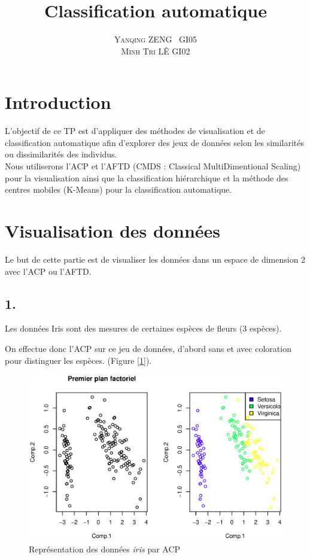 \documentclass{article}
\title{\vspace{-15mm}\fontsize{24pt}{10pt}\selectfont\textbf{Classification automatique}} %
\author{
\large
{\textsc{Yanqing ZENG~ GI05}}\\
{\textsc{Minh Tri LÊ GI02}}
}
\begin{document}
\maketitle %
\thispagestyle{fancy} %


\section*{Introduction}
L'objectif de ce TP est d'appliquer des méthodes de visualisation et de classification automatique afin d'explorer des jeux de données selon les similarités ou dissimilarités des individus.\\
Nous utiliserons l'ACP et l'AFTD (CMDS : Classical MultiDimentional Scaling) pour la visualisation ainsi que la classification hiérarchique et la méthode des centres mobiles (K-Means) pour la classification automatique.


\section{Visualisation des données}

Le but de cette partie est de visualiser les données dans un espace de dimension 2 avec l'ACP ou l'AFTD.

\subsection*{1.}

Les données Iris sont des mesures de certaines espèces de fleurs (3 espèces).

On effectue donc l'ACP sur ce jeu de données, d'abord sans et avec coloration pour distinguer les espèces. (Figure [\ref{iris_acp}]).
\begin{figure}[H]
\centering
\includegraphics[scale=0.5]{./img/iris_acp.eps}
\caption{Représentation des données \textit{iris} par ACP}
\label{iris_acp}
\end{figure}
\end{document}
